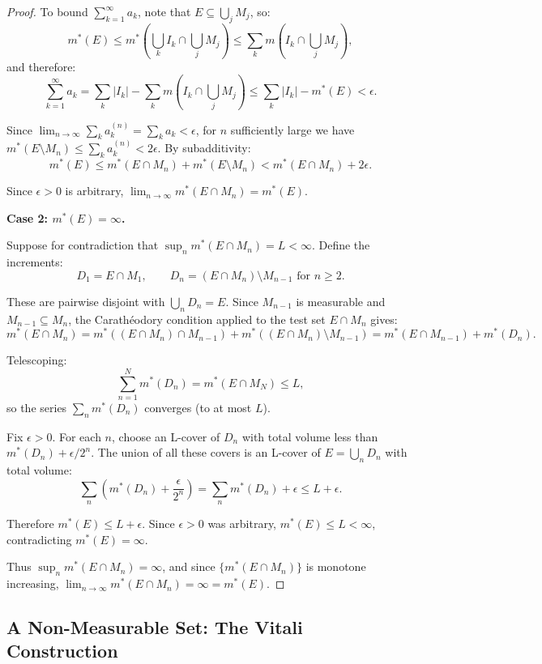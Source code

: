 \documentclass[11pt]{report}
\begin{document}
\begin{proof}
To bound $\sum_{k=1}^{\infty} a_k$, note that $E \subseteq \bigcup_j M_j$, so:
\[
m^*(E) \leq m^*\left(\bigcup_k I_k \cap \bigcup_j M_j\right) \leq \sum_k m\left(I_k \cap \bigcup_j M_j\right),
\]
and therefore:
\[
\sum_{k=1}^{\infty} a_k = \sum_k |I_k| - \sum_k m\left(I_k \cap \bigcup_j M_j\right) \leq \sum_k |I_k| - m^*(E) < \epsilon.
\]

Since $\lim_{n \to \infty} \sum_k a_k^{(n)} = \sum_k a_k < \epsilon$, for $n$ sufficiently large we have $m^*(E \setminus M_n) \leq \sum_k a_k^{(n)} < 2\epsilon$. By subadditivity:
\[
m^*(E) \leq m^*(E \cap M_n) + m^*(E \setminus M_n) < m^*(E \cap M_n) + 2\epsilon.
\]

Since $\epsilon > 0$ is arbitrary, $\lim_{n \to \infty} m^*(E \cap M_n) = m^*(E)$.

\textbf{Case 2: $m^*(E) = \infty$.}

Suppose for contradiction that $\sup_n m^*(E \cap M_n) = L < \infty$. Define the increments:
\[
D_1 = E \cap M_1, \qquad D_n = (E \cap M_n) \setminus M_{n-1} \text{ for } n \geq 2.
\]

These are pairwise disjoint with $\bigcup_n D_n = E$. Since $M_{n-1}$ is measurable and $M_{n-1} \subseteq M_n$, the Carath\'{e}odory condition applied to the test set $E \cap M_n$ gives:
\[
m^*(E \cap M_n) = m^*((E \cap M_n) \cap M_{n-1}) + m^*((E \cap M_n) \setminus M_{n-1}) = m^*(E \cap M_{n-1}) + m^*(D_n).
\]

Telescoping:
\[
\sum_{n=1}^{N} m^*(D_n) = m^*(E \cap M_N) \leq L,
\]
so the series $\sum_n m^*(D_n)$ converges (to at most $L$).

Fix $\epsilon > 0$. For each $n$, choose an L-cover of $D_n$ with total volume less than $m^*(D_n) + \epsilon/2^n$. The union of all these covers is an L-cover of $E = \bigcup_n D_n$ with total volume:
\[
\sum_n \left(m^*(D_n) + \frac{\epsilon}{2^n}\right) = \sum_n m^*(D_n) + \epsilon \leq L + \epsilon.
\]

Therefore $m^*(E) \leq L + \epsilon$. Since $\epsilon > 0$ was arbitrary, $m^*(E) \leq L < \infty$, contradicting $m^*(E) = \infty$.

Thus $\sup_n m^*(E \cap M_n) = \infty$, and since $\{m^*(E \cap M_n)\}$ is monotone increasing, $\lim_{n \to \infty} m^*(E \cap M_n) = \infty = m^*(E)$.
\end{proof}

\subsection{A Non-Measurable Set: The Vitali Construction}
\end{document}
